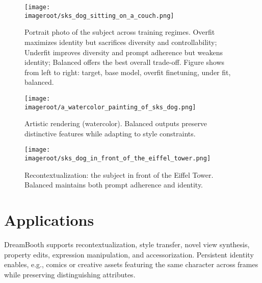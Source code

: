 \documentclass[11pt]{article}
\newcommand{\imageroot}{artifacts/grids_with_ref}
\begin{document}
\begin{figure}[t]
  \centering
  \texttt{[image: \\imageroot/sks\_dog\_sitting\_on\_a\_couch.png]}
  \caption{Portrait photo of the subject across training regimes. Overfit maximizes identity but sacrifices diversity and controllability; Underfit improves diversity and prompt adherence but weakens identity; Balanced offers the best overall trade-off. Figure shows from left to right: target, base model, overfit finetuning, under fit, balanced.}
  \label{fig:portrait}
\end{figure}

\begin{figure}[t]
  \centering
  \texttt{[image: \\imageroot/a\_watercolor\_painting\_of\_sks\_dog.png]}
  \caption{Artistic rendering (watercolor). Balanced outputs preserve distinctive features while adapting to style constraints.}
  \label{fig:watercolor}
\end{figure}

\begin{figure}[t]
  \centering
  \texttt{[image: \\imageroot/sks\_dog\_in\_front\_of\_the\_eiffel\_tower.png]}
  \caption{Recontextualization: the subject in front of the Eiffel Tower. Balanced maintains both prompt adherence and identity.}
  \label{fig:eiffel}
\end{figure}


\section{Applications}
DreamBooth supports recontextualization, style transfer, novel view synthesis, property edits, expression manipulation, and accessorization. Persistent identity enables, e.g., comics or creative assets featuring the same character across frames while preserving distinguishing attributes.
\end{document}
